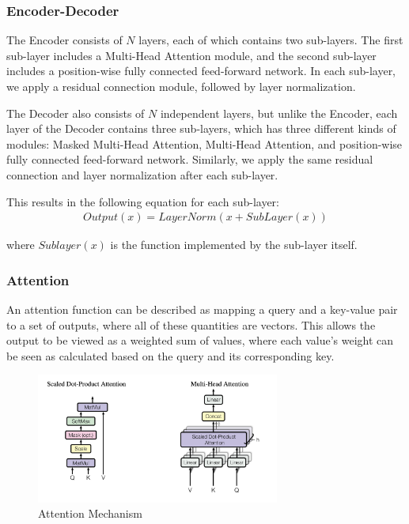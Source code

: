 \documentclass{IEEEtran}
\begin{document}
\subsubsection{Encoder-Decoder}

\par The Encoder consists of $N$ layers, each of which contains two sub-layers. 
The first sub-layer includes a Multi-Head Attention module, and the 
second sub-layer includes a position-wise fully connected feed-forward network. 
In each sub-layer, we apply a residual connection module, followed by layer normalization.

\par The Decoder also consists of $N$ independent layers, but unlike the Encoder, 
each layer of the Decoder contains three sub-layers, which has three different kinds of modules: 
Masked Multi-Head Attention, Multi-Head Attention, and position-wise fully connected 
feed-forward network. Similarly, we apply the same residual connection and layer 
normalization after each sub-layer.

\par This results in the following equation for each sub-layer:
\begin{align*}
    Output(x) = LayerNorm(x + SubLayer(x))
\end{align*}

where $Sublayer(x)$ is the function implemented by the sub-layer itself.


\subsubsection{Attention}
\par An attention function can be described as mapping a query and a key-value pair 
to a set of outputs, where all of these quantities are vectors. This allows the output 
to be viewed as a weighted sum of values, where each value's weight can be seen as 
calculated based on the query and its corresponding key.

\begin{figure}[htbp]
    \centerline{\includegraphics[width = 8cm]{pic/fig2.png}}
    \caption{Attention Mechanism}
    \label{fig}
\end{figure}
\end{document}

